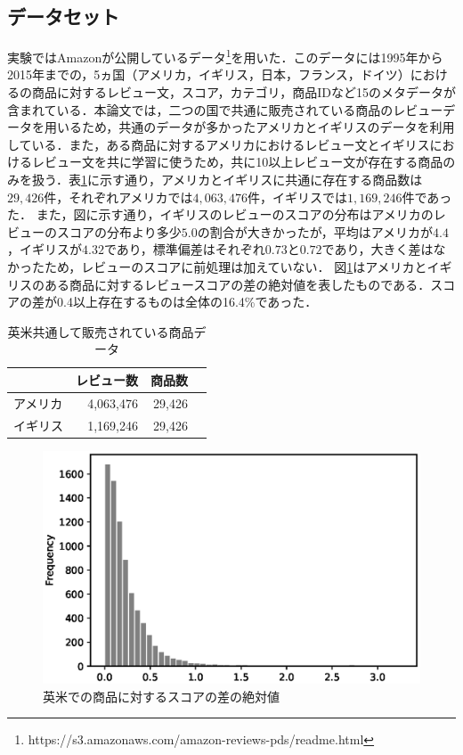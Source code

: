 \documentclass[dvipdfmx,twocolumn,10.5pt]{jsarticle}
\begin{document}
\subsection{データセット}\label{dataset}
実験ではAmazonが公開しているデータ\footnote{https://s3.amazonaws.com/amazon-reviews-pds/readme.html}を用いた．このデータには1995年から2015年までの，5ヵ国（アメリカ，イギリス，日本，フランス，ドイツ）におけるの商品に対するレビュー文，スコア，カテゴリ，商品IDなど15のメタデータが含まれている．本論文では，二つの国で共通に販売されている商品のレビューデータを用いるため，共通のデータが多かったアメリカとイギリスのデータを利用している．また，ある商品に対するアメリカにおけるレビュー文とイギリスにおけるレビュー文を共に学習に使うため，共に10以上レビュー文が存在する商品のみを扱う．表\ref{num_of_data}に示す通り，アメリカとイギリスに共通に存在する商品数は$29,426$件，それぞれアメリカでは$4,063,476$件，イギリスでは$1,169,246$件であった．
また，図に示す通り，イギリスのレビューのスコアの分布はアメリカのレビューのスコアの分布より多少$5.0$の割合が大きかったが，平均はアメリカが$4.4$，イギリスが$4.32$であり，標準偏差はそれぞれ$0.73$と$0.72$であり，大きく差はなかったため，レビューのスコアに前処理は加えていない．
図\ref{score_diff}はアメリカとイギリスのある商品に対するレビュースコアの差の絶対値を表したものである．スコアの差が0.4以上存在するものは全体の16.4\%であった．

\begin{table}[tb]
\centering
\caption{英米共通して販売されている商品データ}
\begin{tabular}{lrrr}
\hline
\multicolumn{1}{c}{} & \multicolumn{1}{c}{レビュー数} & \multicolumn{1}{c}{商品数} \\ \hline
アメリカ         & 4,063,476                          & 29,426             \\
イギリス         & 1,169,246                         & 29,426                 \\ \hline
\end{tabular}
\label{num_of_data}
\end{table}

\begin{figure}[tb]
	\centering
	\includegraphics[width=\linewidth]{images/score_diff_uk_us.eps} 
	\caption{英米での商品に対するスコアの差の絶対値}
	\label{score_diff}
\end{figure}
\end{document}
